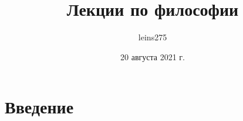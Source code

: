 \documentclass[a4paper,12pt]{article}
\author{leins275}
\title{Лекции по философии}
\date{20 августа 2021 г.}
\begin{document}


\section*{Введение}





\newpage
\tableofcontents
\end{document}
